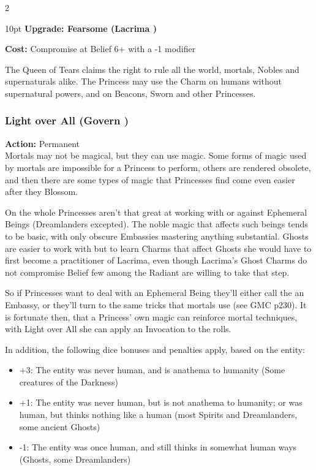 \begin{multicols}{2}
\begin{myindentpar}{10pt}
\textbf{Upgrade: Fearsome (Lacrima \textbullet\textbullet)}

\noindent \textbf{Cost:} Compromise at Belief 6+ with a -1 modifier

The Queen of Tears claims the right to rule all the world, mortals, Nobles and supernaturals alike. The Princess may use the Charm on humans without supernatural powers, and on Beacons, Sworn and other Princesses.\end{myindentpar}



\subsubsection*{Light over All (Govern \textbullet\textbullet)}

\noindent \textbf{Action:} Permanent \\

\noindent Mortals may not be magical, but they can use magic. Some forms of magic used by mortals are impossible for a Princess to perform, others are rendered obsolete, and then there are some types of magic that Princesses find come even easier after they Blossom. 

On the whole Princesses aren't that great at working with or against Ephemeral Beings (Dreamlanders excepted). The noble magic that affects such beings tends to be basic, with only obscure Embassies mastering anything substantial. Ghosts are easier to work with but to learn Charms that affect Ghosts she would have to first become a practitioner of Lacrima, even though Lacrima's Ghost Charms do not compromise Belief few among the Radiant are willing to take that step.

So if Princesses want to deal with an Ephemeral Being they'll either call the an Embassy, or they'll turn to the same tricks that mortals use (see GMC p230). It is fortunate then, that a Princess' own magic can reinforce mortal techniques, with Light over All she can apply an Invocation to the rolls. 

In addition, the following dice bonuses and penalties apply, based on the entity:

\begin{itemize} \item    +3: The entity was never human, and is anathema to humanity (Some creatures of the Darkness)
\item    +1: The entity was never human, but is not anathema to humanity; or was human, but thinks nothing like a human (most Spirits and Dreamlanders, some ancient Ghosts)
\item    -1: The entity was once human, and still thinks in somewhat human ways (Ghosts, some Dreamlanders)
\end{itemize}


\end{multicols}
